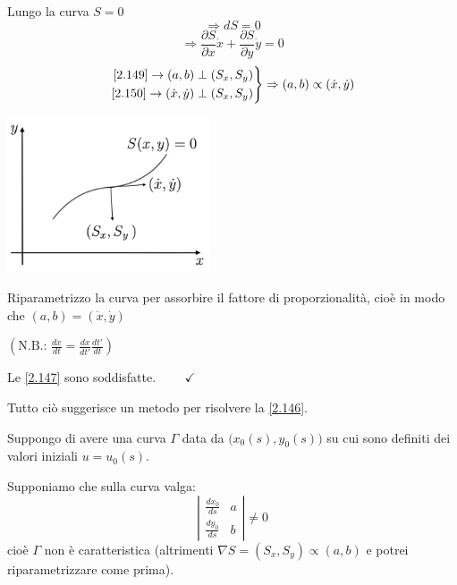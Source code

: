 \documentclass[a4paper,11pt]{report}
\begin{document}
Lungo la curva $S=0$ 
\[
\Rightarrow dS=0
\]
\begin{equation}
\Rightarrow \frac{\partial S}{\partial x}\dot{x}+\frac{\partial S}{\partial y}\dot{y} =0
\label{2.150}
\end{equation}
\[
\left.
\begin{aligned}
\eqref{2.149} \rightarrow (a,b) \perp (S_x,S_y)\\
\eqref{2.150} \rightarrow (\dot{x},\dot{y}) \perp (S_x,S_y)\\
\end{aligned}
\right\}\Rightarrow(a,b)\propto (\dot{x},\dot{y})
\]
\begin{center}
\includegraphics[width=0.45\textwidth]{immagini/caratteristica}
\end{center}
Riparametrizzo la curva per assorbire il fattore di proporzionalit\`a, cio\`e in modo che $(a,b)=(\dot{x},\dot{y})$ 

$\left(\text{N.B.: } \frac{dx}{dt}=\frac{dx}{dt'}\frac{dt'}{dt}\right)$

Le \eqref{2.147} sono soddisfatte. $\qquad \checkmark$

\medskip

Tutto ci\`o suggerisce un metodo per risolvere la \eqref{2.146}.

Suppongo di avere una curva $\Gamma$ data da $\big(x_0(s),y_0(s)\big)$ su cui sono definiti dei valori iniziali $u=u_0(s)$.

Supponiamo che sulla curva valga:
\begin{equation}
\left|\begin{matrix}
\frac{dx_0}{ds} & a \\
\frac{dy_0}{ds} & b
\end{matrix}\right|\neq 0
\label{2.151}
\end{equation}
cio\`e $\Gamma$ non \`e caratteristica (altrimenti $\nabla S = (S_x,S_y) \propto (a,b)$ e potrei riparametrizzare come prima).
\end{document}
